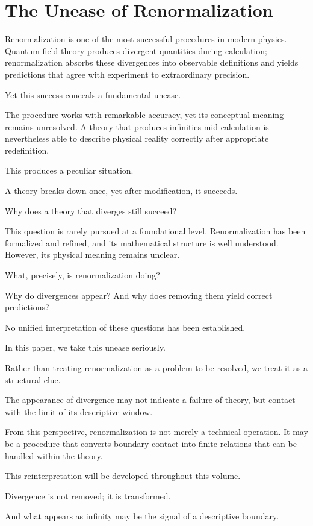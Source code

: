 \section{The Unease of Renormalization}

\label{sec:renorm_clue}

Renormalization is one of the most successful procedures in modern physics.
Quantum field theory produces divergent quantities during calculation;
renormalization absorbs these divergences into observable definitions
and yields predictions that agree with experiment to extraordinary precision.

Yet this success conceals a fundamental unease.

The procedure works with remarkable accuracy,
yet its conceptual meaning remains unresolved.
A theory that produces infinities mid-calculation
is nevertheless able to describe physical reality correctly
after appropriate redefinition.

This produces a peculiar situation.

A theory breaks down once,
yet after modification,
it succeeds.

Why does a theory that diverges still succeed?

This question is rarely pursued at a foundational level.
Renormalization has been formalized and refined,
and its mathematical structure is well understood.
However, its physical meaning remains unclear.

What, precisely, is renormalization doing?

Why do divergences appear?
And why does removing them yield correct predictions?

No unified interpretation of these questions has been established.

In this paper, we take this unease seriously.

Rather than treating renormalization as a problem to be resolved,
we treat it as a structural clue.

The appearance of divergence may not indicate a failure of theory,
but contact with the limit of its descriptive window.

From this perspective,
renormalization is not merely a technical operation.
It may be a procedure that converts boundary contact
into finite relations that can be handled within the theory.

This reinterpretation will be developed throughout this volume.

Divergence is not removed;
it is transformed.

And what appears as infinity
may be the signal of a descriptive boundary.
